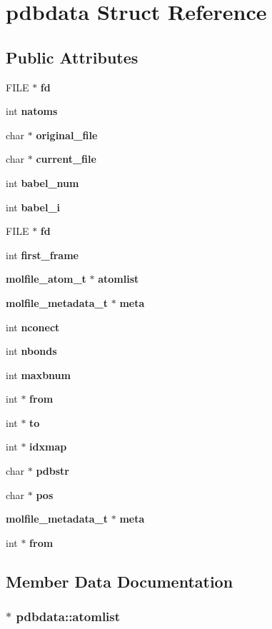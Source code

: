 \section{pdbdata  Struct Reference}
\label{structpdbdata}
\subsection*{Public Attributes}
\begin{CompactItemize}
\item 
FILE $\ast$ {\bf fd}
\item 
int {\bf natoms}
\item 
char $\ast$ {\bf original\_\-file}
\item 
char $\ast$ {\bf current\_\-file}
\item 
int {\bf babel\_\-num}
\item 
int {\bf babel\_\-i}
\item 
FILE $\ast$ {\bf fd}
\item 
int {\bf first\_\-frame}
\item 
{\bf molfile\_\-atom\_\-t} $\ast$ {\bf atomlist}
\item 
{\bf molfile\_\-metadata\_\-t} $\ast$ {\bf meta}
\item 
int {\bf nconect}
\item 
int {\bf nbonds}
\item 
int {\bf maxbnum}
\item 
int $\ast$ {\bf from}
\item 
int $\ast$ {\bf to}
\item 
int $\ast$ {\bf idxmap}
\item 
char $\ast$ {\bf pdbstr}
\item 
char $\ast$ {\bf pos}
\item 
{\bf molfile\_\-metadata\_\-t} $\ast$ {\bf meta}
\item 
int $\ast$ {\bf from}
\end{CompactItemize}


\subsection{Member Data Documentation}
\subsubsection{$\ast$ pdbdata::atomlist}\label{structpdbdata_m8}




